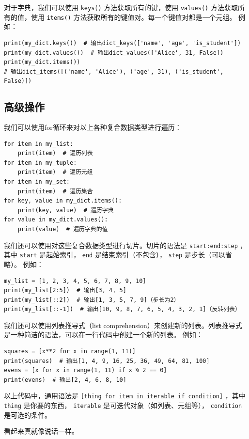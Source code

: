 对于字典，我们可以使用 \texttt{keys()} 方法获取所有的键，使用 \texttt{values()} 方法获取所有的值，使用 \texttt{items()} 方法获取所有的键值对。每一个键值对都是一个元组。
例如：

\begin{verbatim}
print(my_dict.keys())  # 输出dict_keys(['name', 'age', 'is_student'])
print(my_dict.values())  # 输出dict_values(['Alice', 31, False])
print(my_dict.items())
# 输出dict_items([('name', 'Alice'), ('age', 31), ('is_student', False)])
\end{verbatim}

\subsection{高级操作}

我们可以使用for循环来对以上各种复合数据类型进行遍历：
\begin{verbatim}
for item in my_list:
    print(item)  # 遍历列表
for item in my_tuple:
    print(item)  # 遍历元组
for item in my_set:
    print(item)  # 遍历集合
for key, value in my_dict.items():
    print(key, value)  # 遍历字典
for value in my_dict.values():
    print(value)  # 遍历字典的值
\end{verbatim}

我们还可以使用对这些复合数据类型进行切片。切片的语法是 \texttt{start:end:step} ，其中 \texttt{start} 是起始索引， \texttt{end} 是结束索引（不包含）， \texttt{step} 是步长（可以省略）。
例如：
\begin{verbatim}
my_list = [1, 2, 3, 4, 5, 6, 7, 8, 9, 10]
print(my_list[2:5])  # 输出[3, 4, 5]
print(my_list[::2])  # 输出[1, 3, 5, 7, 9]（步长为2）
print(my_list[::-1])  # 输出[10, 9, 8, 7, 6, 5, 4, 3, 2, 1]（反转列表）
\end{verbatim}

我们还可以使用列表推导式（list comprehension）来创建新的列表。列表推导式是一种简洁的语法，可以在一行代码中创建一个新的列表。
例如：
\begin{verbatim}
squares = [x**2 for x in range(1, 11)]
print(squares)  # 输出[1, 4, 9, 16, 25, 36, 49, 64, 81, 100]
evens = [x for x in range(1, 11) if x % 2 == 0]
print(evens)  # 输出[2, 4, 6, 8, 10]
\end{verbatim}

以上代码中，通用语法是 \texttt{[thing for item in iterable if condition]} ，其中 \texttt{thing} 是你要的东西， \texttt{iterable} 是可迭代对象（如列表、元组等）， \texttt{condition} 是可选的条件。

看起来真就像说话一样。

